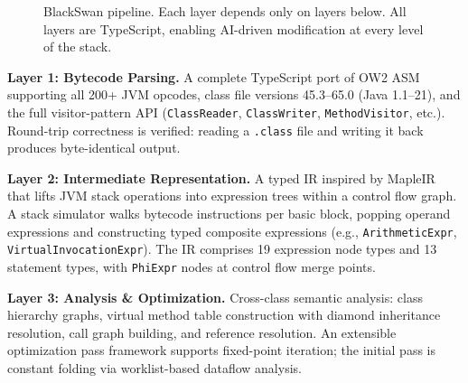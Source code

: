 \documentclass[conference,11pt]{IEEEtran}
\begin{document}
\begin{figure}[t]
\centering
{}
\caption{BlackSwan pipeline. Each layer depends only on layers below. All layers are TypeScript, enabling AI-driven modification at every level of the stack.}
\label{fig:architecture}
\end{figure}

\textbf{Layer 1: Bytecode Parsing.} A complete TypeScript port of OW2 ASM~\cite{asm} supporting all 200+ JVM opcodes, class file versions 45.3--65.0 (Java 1.1--21), and the full visitor-pattern API (\texttt{ClassReader}, \texttt{ClassWriter}, \texttt{MethodVisitor}, etc.). Round-trip correctness is verified: reading a \texttt{.class} file and writing it back produces byte-identical output.

\textbf{Layer 2: Intermediate Representation.} A typed IR inspired by MapleIR~\cite{mapleir} that lifts JVM stack operations into expression trees within a control flow graph. A stack simulator walks bytecode instructions per basic block, popping operand expressions and constructing typed composite expressions (e.g., \texttt{ArithmeticExpr}, \texttt{VirtualInvocationExpr}). The IR comprises 19 expression node types and 13 statement types, with \texttt{PhiExpr} nodes at control flow merge points.

\textbf{Layer 3: Analysis \& Optimization.} Cross-class semantic analysis: class hierarchy graphs, virtual method table construction with diamond inheritance resolution, call graph building, and reference resolution. An extensible optimization pass framework supports fixed-point iteration; the initial pass is constant folding via worklist-based dataflow analysis.
\end{document}
